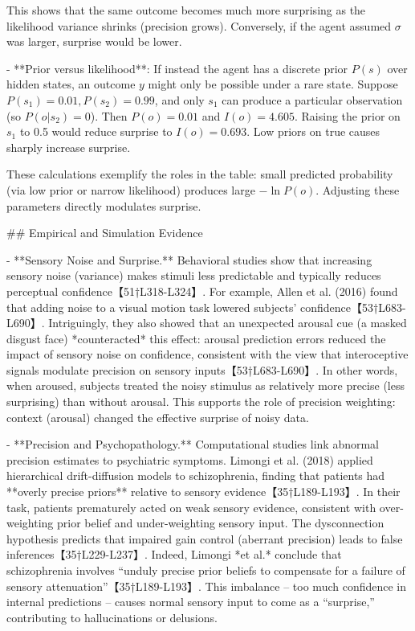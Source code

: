 \documentclass[a4paper]{article}
\begin{document}
    This shows that the same outcome becomes much more surprising as the likelihood variance shrinks (precision grows).  Conversely, if the agent assumed \(\sigma\) was larger, surprise would be lower.
    
    - **Prior versus likelihood**: If instead the agent has a discrete prior \(P(s)\) over hidden states, an outcome \(y\) might only be possible under a rare state.  Suppose \(P(s_1)=0.01, P(s_2)=0.99\), and only \(s_1\) can produce a particular observation (so \(P(o|s_2)=0\)).  Then \(P(o)=0.01\) and \(I(o)=4.605\).  Raising the prior on \(s_1\) to 0.5 would reduce surprise to \(I(o)=0.693\).  Low priors on true causes sharply increase surprise.
    
    These calculations exemplify the roles in the table: small predicted probability (via low prior or narrow likelihood) produces large \(-\ln P(o)\).  Adjusting these parameters directly modulates surprise.
    
    ## Empirical and Simulation Evidence
    
    - **Sensory Noise and Surprise.**  Behavioral studies show that increasing sensory noise (variance) makes stimuli less predictable and typically reduces perceptual confidence【51†L318-L324】.  For example, Allen et al. (2016) found that adding noise to a visual motion task lowered subjects’ confidence【53†L683-L690】.  Intriguingly, they also showed that an unexpected arousal cue (a masked disgust face) *counteracted* this effect: arousal prediction errors reduced the impact of sensory noise on confidence, consistent with the view that interoceptive signals modulate precision on sensory inputs【53†L683-L690】.  In other words, when aroused, subjects treated the noisy stimulus as relatively more precise (less surprising) than without arousal.  This supports the role of precision weighting: context (arousal) changed the effective surprise of noisy data.
    
    - **Precision and Psychopathology.**  Computational studies link abnormal precision estimates to psychiatric symptoms.  Limongi et al. (2018) applied hierarchical drift-diffusion models to schizophrenia, finding that patients had **overly precise priors** relative to sensory evidence【35†L189-L193】.  In their task, patients prematurely acted on weak sensory evidence, consistent with over-weighting prior belief and under-weighting sensory input.  The dysconnection hypothesis predicts that impaired gain control (aberrant precision) leads to false inferences【35†L229-L237】.  Indeed, Limongi *et al.* conclude that schizophrenia involves “unduly precise prior beliefs to compensate for a failure of sensory attenuation”【35†L189-L193】.  This imbalance – too much confidence in internal predictions – causes normal sensory input to come as a “surprise,” contributing to hallucinations or delusions.
    
\end{document}
